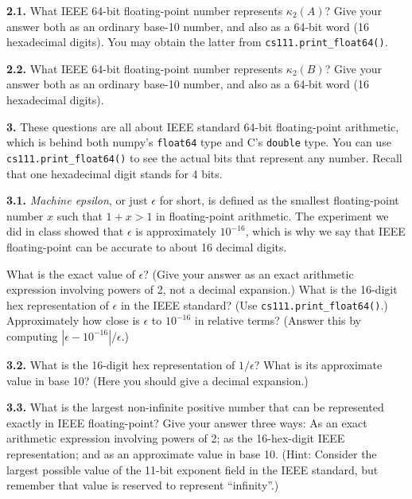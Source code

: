 \documentclass[11pt]{article}
\begin{document}
{\bf 2.1.}
What IEEE 64-bit floating-point number represents $\kappa_2(A)$?
Give your answer both as an ordinary base-10 number, 
and also as a 64-bit word (16 hexadecimal digits).
You may obtain the latter from {\tt cs111.print\_float64()}.

\par\medskip
{\bf 2.2.}
What IEEE 64-bit floating-point number represents $\kappa_2(B)$?
Give your answer both as an ordinary base-10 number, 
and also as a 64-bit word (16 hexadecimal digits).

\par\bigskip
{\bf 3.}
These questions are all about IEEE standard 64-bit floating-point arithmetic,
which is behind both numpy's {\tt float64} type and C's {\tt double} type.
You can use {\tt cs111.print\_float64()} to see the actual bits that represent any number.
Recall that one hexadecimal digit stands for 4 bits.

\par\medskip
{\bf 3.1.}
{\em Machine epsilon}, or just $\epsilon$ for short, is defined as the smallest 
floating-point number $x$ such that $1+x > 1$ in floating-point arithmetic.
The experiment we did in class showed that $\epsilon$ is approximately $10^{-16}$,
which is why we say that IEEE floating-point can be accurate to
about 16 decimal digits.

What is the exact value of $\epsilon$? 
(Give your answer as an exact arithmetic expression involving powers of 2, 
not a decimal expansion.) 
What is the 16-digit hex representation of $\epsilon$ in the IEEE standard? 
(Use {\tt cs111.print\_float64()}.)
Approximately how close is $\epsilon$ to $10^{-16}$ in relative terms?
(Answer this by computing $|\epsilon-10^{-16}|/\epsilon$.)

\par\medskip
{\bf 3.2.}
What is the 16-digit hex representation of $1/\epsilon$? 
What is its approximate value in base 10? 
(Here you should give a decimal expansion.)

\par\medskip
{\bf 3.3.}
What is the largest non-infinite positive number that can be represented exactly
in IEEE floating-point? 
Give your answer three ways: 
As an exact arithmetic expression involving powers of 2;
as the 16-hex-digit IEEE representation;
and as an approximate value in base 10. 
(Hint: Consider the largest possible value of the 11-bit exponent field 
in the IEEE standard, but remember that value is reserved to represent ``infinity''.)
\end{document}
